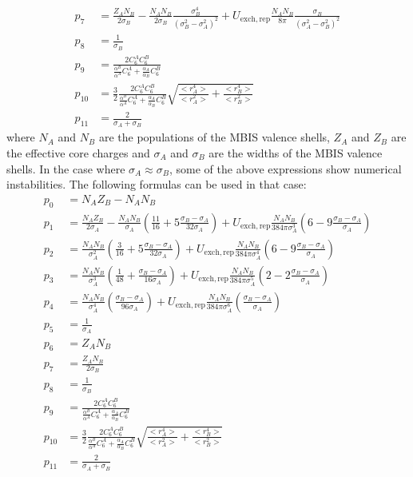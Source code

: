 \begin{itemize}
\begin{align}
    p_7 &= \frac{Z_AN_B}{2\sigma_{B}} - \frac{N_AN_B}{2\sigma_{B}}\frac{\sigma_{B}^4}{(\sigma_{B}^2-\sigma_{A}^2)^2} +  U_{\mathrm{exch,rep}}\frac{N_AN_B}{8\pi} \frac{\sigma_{B}}{(\sigma_{A}^2-\sigma_{B}^2)^2}\\
    p_8 &= \frac{1}{\sigma_{B}} \\
    p_9 &= \frac{2C_6^AC_6^B}{\frac{\alpha^B}{\alpha^A}C_6^A+\frac{\alpha_A}{\alpha_B}C_6^B} \\
    p_{10} &= \frac{3}{2}\frac{2C_6^AC_6^B}{\frac{\alpha^B}{\alpha^A}C_6^A+\frac{\alpha_A}{\alpha_B}C_6^B}\sqrt{\frac{<r_A^4>}{<r_A^2>} + \frac{<r_B^4>}{<r_B^2>} } \\
    p_{11} &= \frac{2}{\sigma_{A}+\sigma_{B}}
  \end{align}
  where $N_A$ and $N_B$ are the populations of the MBIS valence shells, $Z_A$ and $Z_B$ are the effective core charges and $\sigma_{A}$ and $\sigma_{B}$ are the widths of the MBIS valence shells. In the case where $\sigma_{A} \approx \sigma_{B}$, some of the above expressions show numerical instabilities. The following formulas can be used in that case:
  \begin{align}
    p_0 &= N_AZ_B-N_AN_B\\
    p_1 &= \frac{N_AZ_B}{2\sigma_{A}} - \frac{N_AN_B}{\sigma_{A}}\left(\frac{11}{16} + 5\frac{\sigma_{B}-\sigma_{A}}{32\sigma_{A}} \right) +  U_{\mathrm{exch,rep}}\frac{N_AN_B}{384\pi\sigma_{A}^3} \left( 6 -9\frac{\sigma_{B}-\sigma_{A}}{\sigma_{A}} \right) \\
    p_2 &=  \frac{N_AN_B}{\sigma_{A}^2}\left(\frac{3}{16} + 5\frac{\sigma_{B}-\sigma_{A}}{32\sigma_{A}} \right) +  U_{\mathrm{exch,rep}}\frac{N_AN_B}{384\pi\sigma_{A}^4} \left( 6 -9\frac{\sigma_{B}-\sigma_{A}}{\sigma_{A}} \right) \\
    p_3 &=  \frac{N_AN_B}{\sigma_{A}^3}\left(\frac{1}{48} + \frac{\sigma_{B}-\sigma_{A}}{16\sigma_{A}} \right) +  U_{\mathrm{exch,rep}}\frac{N_AN_B}{384\pi\sigma_{A}^5} \left( 2 - 2\frac{\sigma_{B}-\sigma_{A}}{\sigma_{A}} \right) \\
    p_4 &=  \frac{N_AN_B}{\sigma_{A}^4}\left(\frac{\sigma_{B}-\sigma_{A}}{96\sigma_{A}} \right) +  U_{\mathrm{exch,rep}}\frac{N_AN_B}{384\pi\sigma_{A}^6} \left(\frac{\sigma_{B}-\sigma_{A}}{\sigma_{A}} \right) \\
    p_5 &= \frac{1}{\sigma_{A}} \\
    p_6 &= Z_AN_B\\
    p_7 &= \frac{Z_AN_B}{2\sigma_{B}}\\
    p_8 &= \frac{1}{\sigma_{B}} \\
    p_9 &= \frac{2C_6^AC_6^B}{\frac{\alpha^B}{\alpha^A}C_6^A+\frac{\alpha_A}{\alpha_B}C_6^B} \\
    p_{10} &= \frac{3}{2}\frac{2C_6^AC_6^B}{\frac{\alpha^B}{\alpha^A}C_6^A+\frac{\alpha_A}{\alpha_B}C_6^B}\sqrt{\frac{<r_A^4>}{<r_A^2>} + \frac{<r_B^4>}{<r_B^2>} } \\
    p_{11} &= \frac{2}{\sigma_{A}+\sigma_{B}}
  \end{align}


\end{itemize}
